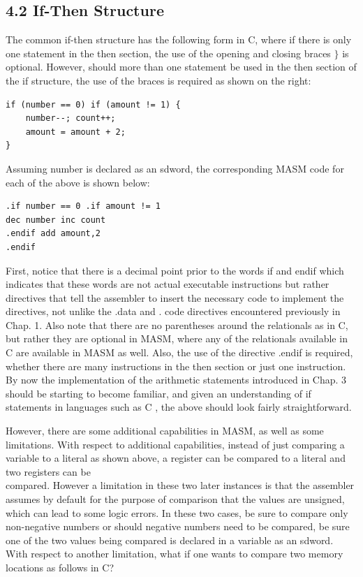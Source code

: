 \documentclass[10pt]{book}
\begin{document}
\subsection*{4.2 If-Then Structure}
The common if-then structure has the following form in C, where if there is only one statement in the then section, the use of the opening and closing braces $\}$ is optional. However, should more than one statement be used in the then section of the if structure, the use of the braces is required as shown on the right:

\begin{verbatim}
if (number == 0) if (amount != 1) {
    number--; count++;
    amount = amount + 2;
}
\end{verbatim}

Assuming number is declared as an sdword, the corresponding MASM code for each of the above is shown below:

\begin{verbatim}
.if number == 0 .if amount != 1
dec number inc count
.endif add amount,2
.endif
\end{verbatim}

First, notice that there is a decimal point prior to the words if and endif which indicates that these words are not actual executable instructions but rather directives that tell the assembler to insert the necessary code to implement the directives, not unlike the .data and . code directives encountered previously in Chap. 1. Also note that there are no parentheses around the relationals as in C, but rather they are optional in MASM, where any of the relationals available in C are available in MASM as well. Also, the use of the directive .endif is required, whether there are many instructions in the then section or just one instruction. By now the implementation of the arithmetic statements introduced in Chap. 3 should be starting to become familiar, and given an understanding of if statements in languages such as C , the above should look fairly straightforward.

However, there are some additional capabilities in MASM, as well as some limitations. With respect to additional capabilities, instead of just comparing a variable to a literal as shown above, a register can be compared to a literal and two registers can be\\
compared. However a limitation in these two later instances is that the assembler assumes by default for the purpose of comparison that the values are unsigned, which can lead to some logic errors. In these two cases, be sure to compare only non-negative numbers or should negative numbers need to be compared, be sure one of the two values being compared is declared in a variable as an sdword. With respect to another limitation, what if one wants to compare two memory locations as follows in C?
\end{document}
